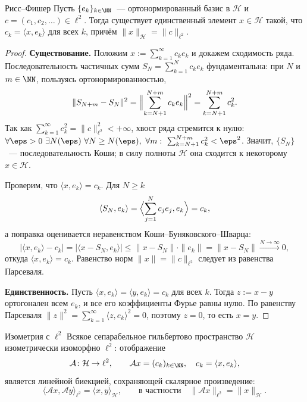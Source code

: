 \begin{Theorem}{Рисс--Фишер}{}
	Пусть $\{e_k\}_{k \in \NN}$~--- ортонормированный базис в $\mathcal{H}$ и $c = (c_1, c_2, \ldots) \in \ell^2$. Тогда существует единственный элемент $x \in \mathcal{H}$ такой, что $c_k = \langle x, e_k\rangle$ для всех $k$, причём $\|x\|_{\mathcal{H}} = \|c\|_{\ell^2}$.
\end{Theorem}

\begin{proof}
	\textbf{Существование.} Положим $x := \sum_{k=1}^{\infty} c_k e_k$ и докажем сходимость ряда. Последовательность частичных сумм $S_N = \sum_{k=1}^{N} c_k e_k$ фундаментальна: при $N$ и $m \in \NN$, пользуясь ортонормированностью,
	\[
	\|S_{N+m} - S_N\|^2 = \Bigl\| \sum_{k=N+1}^{N+m} c_k e_k \Bigr\|^2 = \sum_{k=N+1}^{N+m} c_k^2.
	\]
	Так как $\sum_{k=1}^{\infty} c_k^2 = \|c\|_{\ell^2}^2 < +\infty$, хвост ряда стремится к нулю: $\forall \eps > 0\ \exists N(\eps)\ \forall N \ge N(\eps),\ \forall m:\ \sum_{k=N+1}^{N+m} c_k^2 < \eps^2$. Значит, $\{S_N\}$~--- последовательность Коши; в силу полноты $\mathcal{H}$ она сходится к некоторому $x \in \mathcal{H}$.

	Проверим, что $\langle x, e_k\rangle = c_k$. Для $N \ge k$
	\[
	\langle S_N, e_k\rangle = \Bigl\langle \sum_{j=1}^{N} c_j e_j, e_k \Bigr\rangle = c_k,
	\]
	а поправка оценивается неравенством Коши--Буняковского--Шварца:
	\[
	|\langle x, e_k\rangle - c_k| = |\langle x - S_N, e_k\rangle| \le \|x - S_N\|\cdot\|e_k\| = \|x - S_N\| \xrightarrow{N \to \infty} 0,
	\]
	откуда $\langle x, e_k\rangle = c_k$. Равенство норм $\|x\| = \|c\|_{\ell^2}$ следует из равенства Парсеваля.

	\textbf{Единственность.} Пусть $\langle x, e_k\rangle = \langle y, e_k\rangle = c_k$ для всех $k$. Тогда $z := x - y$ ортогонален всем $e_k$, и все его коэффициенты Фурье равны нулю. По равенству Парсеваля $\|z\|^2 = \sum_{k=1}^{\infty}\langle z, e_k\rangle^2 = 0$, поэтому $z = 0$, то есть $x = y$.
\end{proof}

\begin{Corollary}{Изометрия с $\ell^2$}{}
	Всякое сепарабельное гильбертово пространство $\mathcal{H}$ изометрически изоморфно $\ell^2$: отображение
	\[
	\mathcal{A} \colon \mathcal{H} \to \ell^2, \qquad \mathcal{A}x = (c_k)_{k \in \NN}, \quad c_k = \langle x, e_k\rangle,
	\]
	является линейной биекцией, сохраняющей скалярное произведение:
	\[
	\langle \mathcal{A}x, \mathcal{A}y\rangle_{\ell^2} = \langle x, y\rangle_{\mathcal{H}}, \qquad \text{в частности} \quad \|\mathcal{A}x\|_{\ell^2} = \|x\|_{\mathcal{H}}.
	\]
\end{Corollary}

